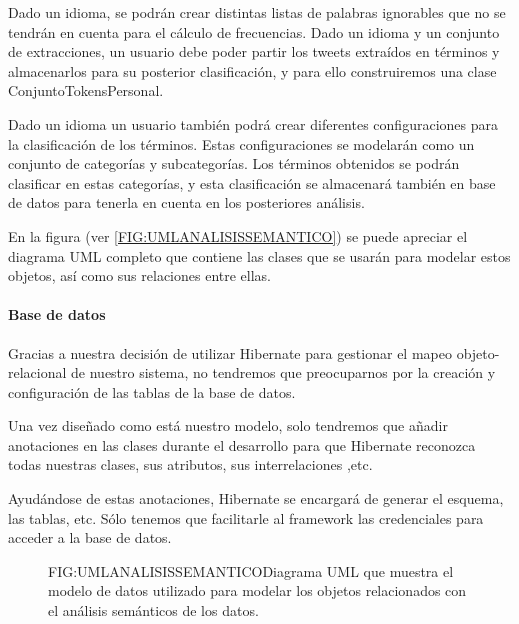 Dado un idioma, se podrán crear distintas listas de palabras ignorables que no se tendrán en cuenta para el cálculo de frecuencias.
Dado un idioma y un conjunto de extracciones, un usuario debe poder partir los tweets extraídos en términos y almacenarlos para su posterior clasificación, y para ello construiremos una clase ConjuntoTokensPersonal.

Dado un idioma un usuario también podrá crear diferentes configuraciones para la clasificación de los términos. Estas configuraciones se modelarán como un conjunto de categorías y subcategorías.
Los términos obtenidos se podrán clasificar en estas categorías, y esta clasificación se almacenará también en base de datos para tenerla en cuenta en los posteriores análisis.

En la figura (ver \ref{FIG:UMLANALISISSEMANTICO}) se puede apreciar el diagrama UML completo que contiene las clases que se usarán para modelar estos objetos, así como sus relaciones entre ellas.

\paragraph{Base de datos}
Gracias a nuestra decisión de utilizar Hibernate para gestionar el mapeo objeto-relacional de nuestro sistema, no tendremos que preocuparnos por la creación y configuración de las tablas de la base de datos.

Una vez diseñado como está nuestro modelo, solo tendremos que añadir anotaciones en las clases durante el desarrollo para que Hibernate reconozca todas nuestras clases, sus atributos, sus interrelaciones ,etc. 

Ayudándose de estas anotaciones, Hibernate se encargará de generar el esquema, las tablas, etc. Sólo tenemos que facilitarle al framework las credenciales para acceder a la base de datos.

\begin{figure}[Diagrama UML Análisis Semántico]{FIG:UMLANALISISSEMANTICO}{Diagrama UML que muestra el modelo de datos utilizado para modelar los objetos relacionados con el análisis semánticos de los datos.}
\end{figure}